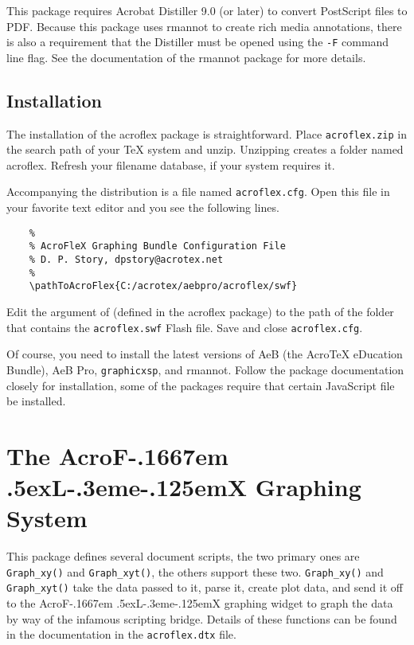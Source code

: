 \documentclass{article}
\makeatletter
\let\pkg\textsf
\def\AcroFLeX{AcroF\kern-.1667em
    \lower.5ex\hbox{L}\kern-.3eme\kern-.125emX\@}
\def\AcroTeX{Acro\!\TeX}
\makeatother
\begin{document}
This package requires Acrobat Distiller 9.0 (or later) to convert
PostScript files to PDF. Because this package uses \pkg{rmannot}
to create rich media annotations, there is also a requirement that
the Distiller must be opened using the \texttt{-F} command line
flag. See the documentation of the \pkg{rmannot} package for more
details.

\subsection{Installation}

The installation of the \pkg{acroflex} package is
straightforward. Place \texttt{acroflex.zip} in the search path of
your {\TeX} system and unzip. Unzipping creates a folder named
\pkg{acroflex}. Refresh your filename database, if your system
requires it.

Accompanying the distribution is a file named \texttt{acroflex.cfg}.
Open this file in your favorite text editor and you see the
following lines.
\begin{Verbatim}
    %
    % AcroFleX Graphing Bundle Configuration File
    % D. P. Story, dpstory@acrotex.net
    %
    \pathToAcroFlex{C:/acrotex/aebpro/acroflex/swf}
\end{Verbatim}
Edit the argument of  (defined in the
\pkg{acroflex} package) to the path of the folder that contains
the \texttt{acroflex.swf} Flash file. Save and close
\texttt{acroflex.cfg}.

Of course, you need to install the latest versions of AeB (the
{\AcroTeX} eDucation Bundle), AeB Pro, \texttt{graphicxsp}, and
\pkg{rmannot}. Follow the package documentation closely for
installation, some of the packages require that certain JavaScript
file be installed.


\section{The \texorpdfstring{\AcroFLeX}{AcroFLeX} Graphing System}

This package defines several document scripts, the two primary ones are
\texttt{Graph\_xy()} and \texttt{Graph\_xyt()}, the others support these two.
\texttt{Graph\_xy()} and \texttt{Graph\_xyt()} take the data passed to it,
parse it, create plot data, and send it off to the {\AcroFLeX} graphing
widget to graph the data by way of the infamous scripting bridge. Details of
these functions can be found in the documentation in the
\texttt{acroflex.dtx} file.
\end{document}
